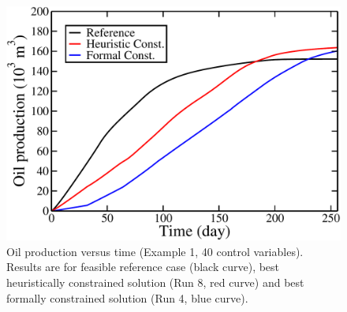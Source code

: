 \documentclass[twocolumn,numbook]{svjour3}          %
\begin{document}
\begin{figure} [ht]
\begin{center}
\includegraphics[totalheight=2.17in,angle=0]{RevenuePI2.pdf}
\end{center}
\caption{Oil production versus time (Example 1, 40 control variables). Results are for
  feasible reference case (black curve), best heuristically constrained solution (Run 8, red curve)
  and best formally constrained solution (Run 4, blue curve).}
\label{fig:PIRevenue}
\end{figure}
\end{document}
